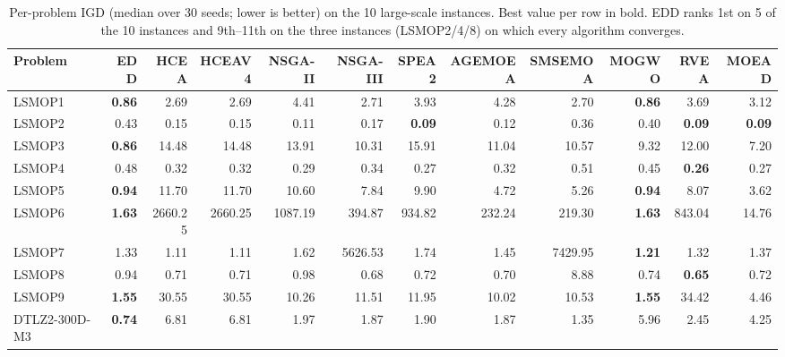 \begin{table}[t]
\centering
\caption{Per-problem IGD (median over 30 seeds; lower is better) on the
10 large-scale instances. Best value per row in bold. EDD ranks 1st on
5 of the 10 instances and 9th--11th on the three instances
(LSMOP2/4/8) on which every algorithm converges.}
\label{tab:igd}
\setlength{\tabcolsep}{4pt}
\begin{tabular}{lrrrrrrrrrrr}
\toprule
Problem & EDD & HCEA & HCEAV4 & NSGA-II & NSGA-III & SPEA2 & AGEMOEA & SMSEMOA & MOGWO & RVEA & MOEAD \\
\midrule
LSMOP1        & \textbf{0.86} & 2.69 & 2.69 & 4.41 & 2.71 & 3.93 & 4.28 & 2.70 & \textbf{0.86} & 3.69 & 3.12 \\
LSMOP2        & 0.43 & 0.15 & 0.15 & 0.11 & 0.17 & \textbf{0.09} & 0.12 & 0.36 & 0.40 & \textbf{0.09} & \textbf{0.09} \\
LSMOP3        & \textbf{0.86} & 14.48 & 14.48 & 13.91 & 10.31 & 15.91 & 11.04 & 10.57 & 9.32 & 12.00 & 7.20 \\
LSMOP4        & 0.48 & 0.32 & 0.32 & 0.29 & 0.34 & 0.27 & 0.32 & 0.51 & 0.45 & \textbf{0.26} & 0.27 \\
LSMOP5        & \textbf{0.94} & 11.70 & 11.70 & 10.60 & 7.84 & 9.90 & 4.72 & 5.26 & \textbf{0.94} & 8.07 & 3.62 \\
LSMOP6        & \textbf{1.63} & 2660.25 & 2660.25 & 1087.19 & 394.87 & 934.82 & 232.24 & 219.30 & \textbf{1.63} & 843.04 & 14.76 \\
LSMOP7        & 1.33 & 1.11 & 1.11 & 1.62 & 5626.53 & 1.74 & 1.45 & 7429.95 & \textbf{1.21} & 1.32 & 1.37 \\
LSMOP8        & 0.94 & 0.71 & 0.71 & 0.98 & 0.68 & 0.72 & 0.70 & 8.88 & 0.74 & \textbf{0.65} & 0.72 \\
LSMOP9        & \textbf{1.55} & 30.55 & 30.55 & 10.26 & 11.51 & 11.95 & 10.02 & 10.53 & \textbf{1.55} & 34.42 & 4.46 \\
DTLZ2-300D-M3 & \textbf{0.74} & 6.81 & 6.81 & 1.97 & 1.87 & 1.90 & 1.87 & 1.35 & 5.96 & 2.45 & 4.25 \\
\bottomrule
\end{tabular}
\end{table}

